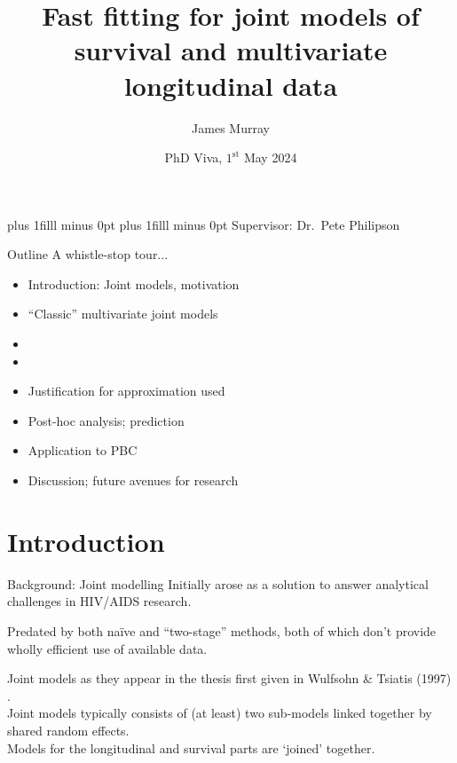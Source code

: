 \documentclass[10pt]{beamer}
\title{Fast fitting for joint models of survival and multivariate longitudinal data}
\author{James Murray}
\date{PhD Viva, $1^{\mathrm{st}}$ May 2024}
\def\vfilll{\vskip 0pt plus 1filll minus 0pt }
\begin{document}
\begin{frame}
    \vfilll
    \titlepage
    \vfilll
    \small
    Supervisor: Dr.\ Pete Philipson
\end{frame}

\begin{frame}{Outline}
A whistle-stop tour...

\begin{itemize}
    \item Introduction: Joint models, motivation
    \vspace{2mm}
    \item ``Classic'' multivariate joint models
    \vspace{2mm}
    \item {}
    \vspace{2mm}
    \item {}
    \vspace{2mm}
    \item Justification for approximation used
    \vspace{2mm}
    \item Post-hoc analysis; prediction
    \vspace{2mm}
    \item Application to PBC
    \vspace{2mm}
    \item Discussion; future avenues for research
\end{itemize}
    
\end{frame}

\section{Introduction}
\begin{frame}{Background: Joint modelling}
    Initially arose as a solution to answer analytical challenges in HIV/AIDS research.\\

    \vspace*{5mm}

    Predated by both na\"{i}ve and ``two-stage'' methods, both of which don't provide wholly efficient use of available data.\\

    \vspace*{5mm}

    Joint models as they appear in the thesis first given in Wulfsohn \& Tsiatis (1997) \cite{Wulfsohn97}.\\

    \vspace*{5mm}
    Joint models typically consists of (at least) two sub-models linked together by shared random effects.\\
    Models for the longitudinal and survival parts are `joined' together.
\end{frame}
\end{document}
